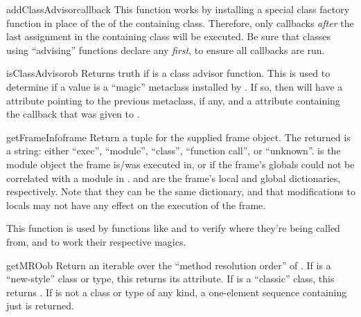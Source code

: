 \begin{verbatim%
}
\begin{verbatim%
}
\begin{verbatim%
}
\begin{verbatim%
}
\begin{verbatim%
}
\begin{verbatim%
}
\begin{funcdesc}{addClassAdvisor}{callback }
This function works by installing a special class factory function in
place of the  of the containing class.  Therefore, only
callbacks \emph{after} the last  assignment in the
containing class will be executed.  Be sure that classes using ``advising''
functions declare any  \emph{first}, to ensure all
callbacks are run.
\end{funcdesc}

\begin{funcdesc}{isClassAdvisor}{ob}
Returns truth if  is a class advisor function.  This is used to
determine if a  value is a ``magic'' metaclass installed
by .  If so, then  will have a
 attribute pointing to the previous metaclass,
if any, and a  attribute containing the callback that was
given to .
\end{funcdesc}

\begin{funcdesc}{getFrameInfo}{frame}
Return a  tuple for
the supplied frame object.  The returned  is a string: either
``exec'', ``module'', ``class'', ``function call'', or ``unknown''.
 is the module object the frame is/was executed in, or
 if the frame's globals could not be correlated with a module in
.   and  are the frame's local
and global dictionaries, respectively.  Note that they can be the same
dictionary, and that modifications to locals may not have any effect on the
execution of the frame.

This function is used by functions like  and
 to verify where they're being called from, and to work
their respective magics.
\end{funcdesc}


\begin{funcdesc}{getMRO}{ob }
Return an iterable over the ``method resolution order'' of .  If
 is a ``new-style'' class or type, this returns its 
attribute.  If  is a ``classic'' class, this returns
.  If  is not a class
or type of any kind, a one-element sequence containing just  is
returned.
\end{funcdesc}



\end{verbatim%
}
\end{verbatim%
}
\end{verbatim%
}
\end{verbatim%
}
\end{verbatim%
}
\end{verbatim%
}
